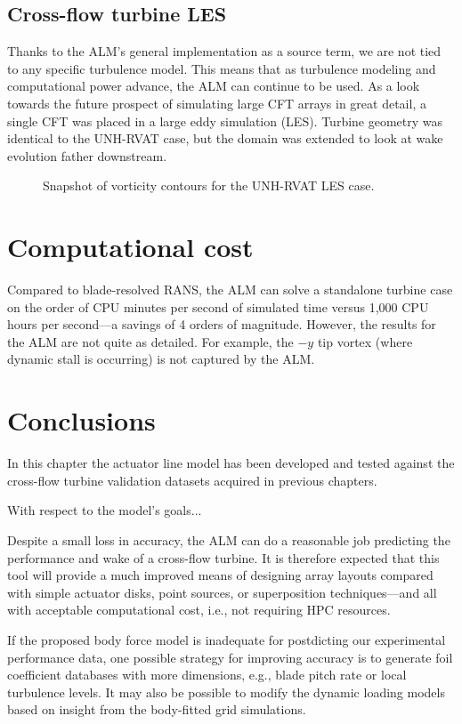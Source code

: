 \subsection{Cross-flow turbine LES}

Thanks to the ALM's general implementation as a source term, we are not tied to
any specific turbulence model. This means that as turbulence modeling and
computational power advance, the ALM can continue to be used. As a look towards
the future prospect of simulating large CFT arrays in great detail, a single CFT
was placed in a large eddy simulation (LES). Turbine geometry was identical to
the UNH-RVAT case, but the domain was extended to look at wake evolution father
downstream.

\begin{figure}
    \caption{Snapshot of vorticity contours for the UNH-RVAT LES case.}
    
    \label{RVAT-LES}
\end{figure}




\section{Computational cost}

Compared to blade-resolved RANS, the ALM can solve a standalone turbine case on
the order of CPU minutes per second of simulated time versus 1,000 CPU hours per
second---a savings of 4 orders of magnitude. However, the results for the ALM
are not quite as detailed. For example, the $-y$ tip vortex (where dynamic stall
is occurring) is not captured by the ALM.


\section{Conclusions}

In this chapter the actuator line model has been developed and tested against
the cross-flow turbine validation datasets acquired in previous chapters.

With respect to the model's goals...

Despite a small loss in accuracy, the ALM can do a reasonable job predicting the
performance and wake of a cross-flow turbine. It is therefore expected that this
tool will provide a much improved means of designing array layouts compared with
simple actuator disks, point sources, or superposition techniques---and all with
acceptable computational cost, i.e., not requiring HPC resources.


If the proposed body force model is inadequate for postdicting our experimental
performance data, one possible strategy for improving accuracy is to generate
foil coefficient databases with more dimensions, e.g., blade pitch rate or local
turbulence levels. It may also be possible to modify the dynamic loading models
based on insight from the body-fitted grid simulations.
